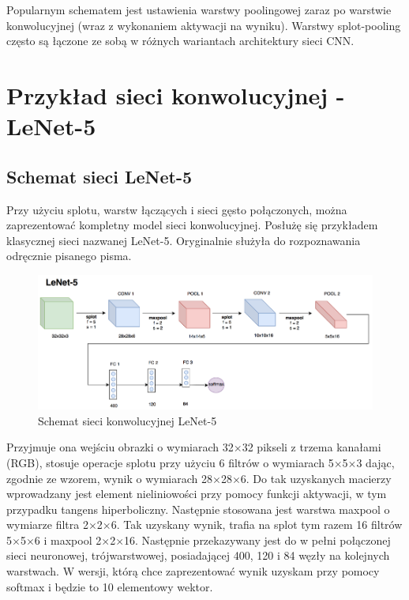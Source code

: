 Popularnym schematem jest ustawienia warstwy poolingowej zaraz po warstwie konwolucyjnej (wraz z wykonaniem aktywacji na wyniku). Warstwy splot-pooling często są łączone ze sobą w różnych wariantach architektury sieci CNN.

\section{Przykład sieci konwolucyjnej - LeNet-5}
\label{lenet5}

\subsection{Schemat sieci LeNet-5}

Przy użyciu splotu, warstw łączących i sieci gęsto połączonych, można zaprezentować kompletny model sieci konwolucyjnej. Posłużę się przykładem klasycznej sieci nazwanej LeNet-5. Oryginalnie służyła do rozpoznawania odręcznie pisanego pisma.

\begin{figure}[ht]
\centerline{\includegraphics[scale=1]{resources/lenet5.png}}
\caption{Schemat sieci konwolucyjnej LeNet-5}
\label{fig:lenet5}
\end{figure}

Przyjmuje ona wejściu obrazki o wymiarach 32\(\times\)32 pikseli z trzema kanałami (RGB), stosuje operacje splotu przy użyciu 6 filtrów o wymiarach 5\(\times\)5\(\times\)3 dając, zgodnie ze wzorem, wynik o wymiarach 28\(\times\)28\(\times\)6. Do tak uzyskanych macierzy wprowadzany jest element nieliniowości przy pomocy funkcji aktywacji, w tym przypadku tangens hiperboliczny. Następnie stosowana jest warstwa maxpool o wymiarze filtra 2\(\times\)2\(\times\)6. Tak uzyskany wynik, trafia na splot
tym razem 16 filtrów 5\(\times\)5\(\times\)6 i maxpool 2\(\times\)2\(\times\)16. Następnie przekazywany jest do w pełni połączonej sieci neuronowej, trójwarstwowej, posiadającej 400, 120 i 84 węzły na kolejnych warstwach. W wersji, którą chce zaprezentować wynik uzyskam przy pomocy softmax i będzie to 10 elementowy wektor.

